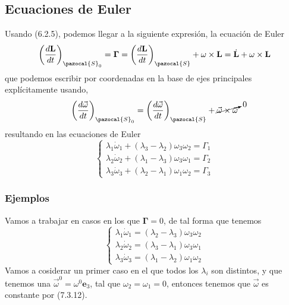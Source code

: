 \subsection{Ecuaciones de Euler}
Usando (6.2.5), podemos llegar a la siguiente expresión, la ecuación de Euler
\begin{equation} \label{6.1.1}
    \left(\frac{d\mathbf{L}}{dt}\right)_{\pazocal{S}_0} = \mathbf{\Gamma} = \left(\frac{d\mathbf{L}}{dt}\right)_{\pazocal{S}} + \omega \times \mathbf{L} = \dot{\mathbf{L}} + \omega \times \mathbf{L}
\end{equation}
que podemos escribir por coordenadas en la base de ejes principales explícitamente usando,
\begin{equation} \label{6.1.1}
    \left(\frac{d \vec{\omega}}{dt}\right)_{\pazocal{S}_0} = \left(\frac{d \vec{\omega}}{dt}\right)_\pazocal{S} + \cancelto{0}{\vec{\omega} \times \vec{\omega}}
\end{equation}
resultando en las ecuaciones de Euler
\begin{equation} \label{6.1.1}
    \left\{\begin{matrix}
        \lambda_1 \dot{\omega}_1 + (\lambda_3-\lambda_2) \omega_3 \omega_2 = \Gamma_1 \\
        \lambda_2 \dot{\omega}_2 + (\lambda_1-\lambda_3) \omega_3 \omega_1 = \Gamma_2\\
        \lambda_3 \dot{\omega}_3 + (\lambda_2-\lambda_1) \omega_1 \omega_2 = \Gamma_3
    \end{matrix}\right.
\end{equation}
\subsubsection{Ejemplos}
Vamos a trabajar en casos en los que $\mathbf{\Gamma} = 0$, de tal forma que tenemos
\begin{equation} \label{6.1.1}
    \left\{\begin{matrix}
        \lambda_1 \dot{\omega}_1 = (\lambda_2-\lambda_3) \omega_3 \omega_2  \\
        \lambda_2 \dot{\omega}_2 = (\lambda_3-\lambda_1) \omega_3 \omega_1 \\
        \lambda_3 \dot{\omega}_3 = (\lambda_1-\lambda_2) \omega_1 \omega_2 
    \end{matrix}\right.
\end{equation}
Vamos a cosiderar un primer caso en el que todos los $\lambda_i$ son distintos, y que tenemos una $\vec{\omega}^0 = \omega^0 \mathbf{e}_3$, tal que $\omega_2 = \omega_1 = 0$, entonces tenemos que $\vec{\omega}$ es constante por (7.3.12).


